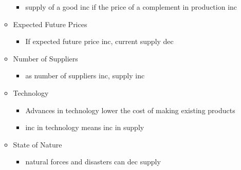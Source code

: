 \documentclass[11pt]{article}
\begin{document}
\begin{itemize}
\begin{itemize}
\begin{itemize}
\item supply of a good inc if the price of a complement in production inc
\end{itemize}
\item Expected Future Prices
\begin{itemize}
\item If expected future price inc, current supply dec
\end{itemize}
\item Number of Suppliers
\begin{itemize}
\item as number of suppliers inc, supply inc
\end{itemize}
\item Technology
\begin{itemize}
\item Advances in technology lower the cost of making existing products
\item inc in technology means inc in supply
\end{itemize}
\item State of Nature
\begin{itemize}
\item natural forces and disasters can dec supply
\end{itemize}
\end{itemize}
\end{itemize}
\end{document}
